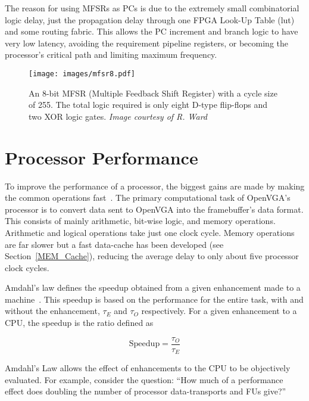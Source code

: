 The reason for using MFSRs as PCs is due to the extremely small combinatorial
logic delay, just the propagation delay through one FPGA Look-Up
Table (\gls{lut}) and some routing
fabric. This allows the PC increment and branch logic to have very low latency,
avoiding the requirement pipeline registers, or becoming the processor's critical
path and limiting maximum frequency.

\begin{figure}[h!]
\begin{center}
\texttt{[image: images/mfsr8.pdf]}
\caption[An 8-bit MFSR with a cycle size of 255]{An 8-bit MFSR (Multiple
Feedback Shift Register) with a cycle size of 255. The total logic required is
only eight D-type flip-flops and two XOR logic gates. \textit{Image courtesy
of R. Ward}~\cite{MFSR_List}}
\label{CPU_MFSR8}
\end{center}
\end{figure}


\section{Processor Performance}
To improve the performance of a processor, the biggest gains are made by making
the common operations fast~\cite{Comp_Arch}. The primary computational task of
OpenVGA's processor is to convert data sent to OpenVGA into the framebuffer's
data format. This consists of mainly arithmetic, bit-wise logic, and memory
operations. Arithmetic and logical operations take just one clock cycle. Memory
operations are far slower but a fast data-cache has been developed (see
Section~\ref{MEM_Cache}), reducing the average delay to only about five processor
clock cycles.


Amdahl's law defines the speedup obtained from a given enhancement made to a
machine~\cite{Comp_Arch}. This speedup is based on the performance for the entire
task, with and without the enhancement, $\tau_E$ and $\tau_O$ respectively. For a
given enhancement to a CPU, the speedup is the ratio defined as

\[
\mathrm{Speedup} = \frac{\tau_O}{\tau_E}
\]

Amdahl's Law allows the effect of enhancements to the CPU to be objectively
evaluated. For example, consider the question: ``How much of a performance effect
does doubling the number of processor data-transports and FUs give?''


